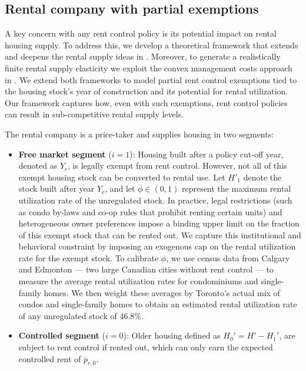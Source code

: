 \documentclass[parskip=full]{article}
\begin{document}
\subsection{Rental company with partial exemptions}\label{sec:rental_company}

A key concern with any rent control policy is its potential impact on rental housing supply. To address this, we develop a theoretical framework that extends and deepens the rental supply ideas in \citet{fallis-1985}. Moreover, to generate a realistically finite rental supply elasticity we exploit the convex management costs approach in \citet{garrigaeetal-2009}. We extend both frameworks to model partial rent control exemptions tied to the housing stock’s year of construction and its potential for rental utilization. Our framework captures how, even with such exemptions, rent control policies can result in sub-competitive rental supply levels.

The rental company is a price-taker and supplies housing in two segments:
\begin{itemize}
    \item \textbf{Free market segment} ($i=1$): Housing built after a policy cut-off year, denoted as $Y_{c}$, is legally exempt from rent control. However, not all of this exempt housing stock can be converted to rental use. Let $H'_1$ denote the stock built after year $Y_{c}$, and let $\phi \in (0,1)$ represent the maximum rental utilization rate of the unregulated stock. In practice, legal restrictions (such as condo by-laws and co-op rules that prohibit renting certain units) and heterogeneous owner preferences impose a binding upper limit on the fraction of this exempt stock that can be rented out. We capture this institutional and behavioral constraint by imposing an exogenous cap on the rental utilization rate for the exempt stock. To calibrate $\phi$, we use census data from Calgary and Edmonton — two large Canadian cities without rent control — to measure the average rental utilization rates for condominiums and single-family homes. We then weight these averages by Toronto’s actual mix of condos and single-family homes to obtain an estimated rental utilization rate of any unregulated stock of 46.8\%.
    \item \textbf{Controlled segment} ($i=0$): Older housing defined as $H_0'=H'-H_1'$, are subject to rent control if rented out, which can only earn the expected controlled rent of $\overline{p}_{r,0}$.
\end{itemize}
\end{document}
